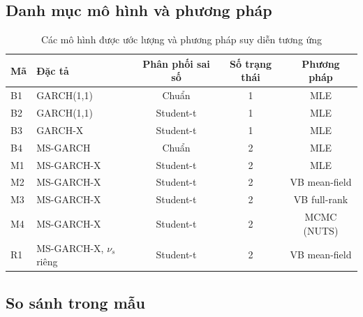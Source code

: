 \documentclass[11pt,a4paper]{article}
\begin{document}
\subsection{Danh mục mô hình và phương pháp}

\begin{table}[H]\centering
\caption{Các mô hình được ước lượng và phương pháp suy diễn tương ứng}
\begin{tabularx}{\textwidth}{l >{\raggedright\arraybackslash}p{3.1cm} C C C}
\toprule
\textbf{Mã} & \textbf{Đặc tả} & \textbf{Phân phối sai số} & \textbf{Số trạng thái} & \textbf{Phương pháp} \\
\midrule
B1 & GARCH(1,1) & Chuẩn & 1 & MLE \\
B2 & GARCH(1,1) & Student-t & 1 & MLE \\
B3 & GARCH-X & Student-t & 1 & MLE \\
B4 & MS-GARCH & Chuẩn & 2 & MLE \\
M1 & MS-GARCH-X & Student-t & 2 & MLE \\
M2 & MS-GARCH-X & Student-t & 2 & VB mean-field \\
M3 & MS-GARCH-X & Student-t & 2 & VB full-rank \\
M4 & MS-GARCH-X & Student-t & 2 & MCMC (NUTS) \\
R1 & MS-GARCH-X, $\nu_s$ riêng & Student-t & 2 & VB mean-field \\
\bottomrule
\end{tabularx}
\end{table}


\subsection{So sánh trong mẫu}
\end{document}
